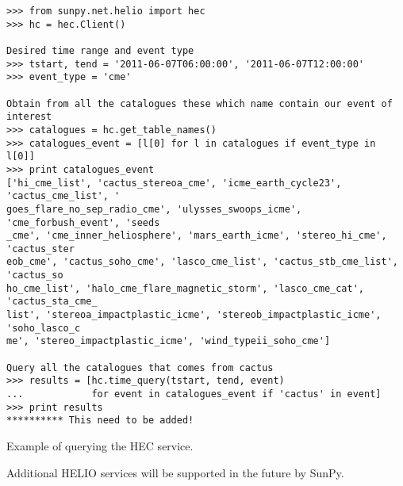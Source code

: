 \begin{listing}[h]
\begin{verbatim}
>>> from sunpy.net.helio import hec
>>> hc = hec.Client()

Desired time range and event type
>>> tstart, tend = '2011-06-07T06:00:00', '2011-06-07T12:00:00'
>>> event_type = 'cme'

Obtain from all the catalogues these which name contain our event of interest
>>> catalogues = hc.get_table_names()
>>> catalogues_event = [l[0] for l in catalogues if event_type in l[0]]
>>> print catalogues_event
['hi_cme_list', 'cactus_stereoa_cme', 'icme_earth_cycle23', 'cactus_cme_list', '
goes_flare_no_sep_radio_cme', 'ulysses_swoops_icme', 'cme_forbush_event', 'seeds
_cme', 'cme_inner_heliosphere', 'mars_earth_icme', 'stereo_hi_cme', 'cactus_ster
eob_cme', 'cactus_soho_cme', 'lasco_cme_list', 'cactus_stb_cme_list', 'cactus_so
ho_cme_list', 'halo_cme_flare_magnetic_storm', 'lasco_cme_cat', 'cactus_sta_cme_
list', 'stereoa_impactplastic_icme', 'stereob_impactplastic_icme', 'soho_lasco_c
me', 'stereo_impactplastic_icme', 'wind_typeii_soho_cme']

Query all the catalogues that comes from cactus
>>> results = [hc.time_query(tstart, tend, event) 
...            for event in catalogues_event if 'cactus' in event]
>>> print results
********** This need to be added!
\end{verbatim}
\caption{Example of querying the HEC service.}
\label{code:helio}
\end{listing}

Additional HELIO services will be supported in the future by SunPy.